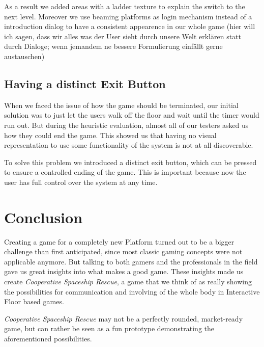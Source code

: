 \documentclass{sigchi}
\begin{document}
As a result we added areas with a ladder texture to explain the switch to the next level. Moreover we use beaming platforms as login mechanism instead of a introduction dialog to have a consistent appearence in our whole game (hier will ich sagen, dass wir alles was der User sieht durch unsere Welt erklären statt durch Dialoge; wenn jemandem ne bessere Formulierung einfällt gerne austauschen)

\subsection{Having a distinct Exit Button}
\vspace{1mm}
When we faced the issue of how the game should be terminated, our initial solution was to just let the users walk off the floor and wait until the timer would run out. But during the heuristic evaluation, almost all of our testers asked us how they could end the game. This showed us that having no visual representation to use some functionality of the system is not at all discoverable. 

To solve this problem we introduced a distinct exit button, which can be pressed to ensure a controlled ending of the game. This is important because now the user has full control over the system at any time. 

\section{Conclusion}
\vspace{1mm}

Creating a game for a completely new Platform turned out to be a bigger challenge than first anticipated, since most classic gaming concepts were not applicable anymore. But talking to both gamers and the professionals in the field gave us great insights into what makes a good game. These insights made us create \textit{Cooperative Spaceship Rescue}, a game that we think of as really showing the possibilities for communication and involving of the whole body in Interactive Floor based games. \newline


\textit{Cooperative Spaceship Rescue} may not be a perfectly rounded, market-ready game, but can rather be seen as a fun prototype demonstrating the aforementioned possibilities.


\balance
\end{document}
